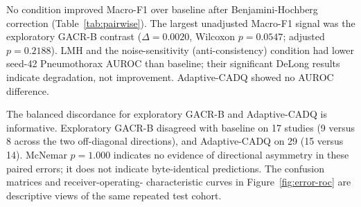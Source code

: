 \documentclass[a4paper,fleqn]{cas-sc}
\begin{document}
No condition improved Macro-F1 over baseline after Benjamini-Hochberg
correction (Table~\ref{tab:pairwise}). The largest unadjusted Macro-F1 signal
was the exploratory GACR-B contrast ($\Delta=0.0020$, Wilcoxon $p=0.0547$;
adjusted $p=0.2188$). LMH and the noise-sensitivity (anti-consistency)
condition had lower seed-42
Pneumothorax AUROC than baseline; their significant DeLong results indicate
degradation, not improvement. Adaptive-CADQ showed no AUROC difference.

\begin{table}[pos=htbp]
\centering
\caption{Paired comparisons with baseline. Wilcoxon uses eight paired
seed-level Macro-F1 values. DeLong and McNemar use the retained seed-42
probability and prediction arrays for the same 455 studies. Values in
parentheses are Benjamini-Hochberg adjusted within each test family. McNemar
$n_{01}/n_{10}$ are the discordant counts; $p=1$ does not imply identical
predictions.}
\label{tab:pairwise}
\scriptsize
{}
\end{table}

The balanced discordance for exploratory GACR-B and Adaptive-CADQ is informative.
Exploratory GACR-B disagreed
with baseline on 17 studies (9 versus 8 across the two off-diagonal directions),
and Adaptive-CADQ on 29 (15 versus 14). McNemar $p=1.000$ indicates no evidence
of directional asymmetry in these paired errors; it does not indicate
byte-identical predictions. The confusion matrices and receiver-operating-
characteristic curves in Figure~\ref{fig:error-roc} are descriptive views of
the same repeated test cohort.
\end{document}

